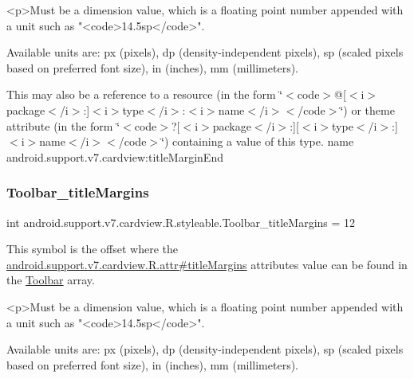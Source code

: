 \begin{DoxyVerb}      <p>Must be a dimension value, which is a floating point number appended with a unit such as "<code>14.5sp</code>".
\end{DoxyVerb}
 Available units are\+: px (pixels), dp (density-\/independent pixels), sp (scaled pixels based on preferred font size), in (inches), mm (millimeters). 

This may also be a reference to a resource (in the form \char`\"{}$<$code$>$@\mbox{[}$<$i$>$package$<$/i$>$\+:\mbox{]}$<$i$>$type$<$/i$>$\+:$<$i$>$name$<$/i$>$$<$/code$>$\char`\"{}) or theme attribute (in the form \char`\"{}$<$code$>$?\mbox{[}$<$i$>$package$<$/i$>$\+:\mbox{]}\mbox{[}$<$i$>$type$<$/i$>$\+:\mbox{]}$<$i$>$name$<$/i$>$$<$/code$>$\char`\"{}) containing a value of this type.  name android.\+support.\+v7.\+cardview\+:title\+Margin\+End \mbox{\label{classandroid_1_1support_1_1v7_1_1cardview_1_1R_1_1styleable_ae38a718516abd89948a47ede4fa58b9f}} 
\subsubsection{\texorpdfstring{Toolbar\+\_\+title\+Margins}{Toolbar\_titleMargins}}
{\footnotesize\ttfamily int android.\+support.\+v7.\+cardview.\+R.\+styleable.\+Toolbar\+\_\+title\+Margins = 12\hspace{0.3cm}{\ttfamily [static]}}

This symbol is the offset where the \hyperlink{classandroid_1_1support_1_1v7_1_1cardview_1_1R_1_1attr_a56eb14b3fe1237fddcc2b1837677a229}{android.\+support.\+v7.\+cardview.\+R.\+attr\#title\+Margins} attribute\textquotesingle{}s value can be found in the \hyperlink{classandroid_1_1support_1_1v7_1_1cardview_1_1R_1_1styleable_a26149aeb8fd339abe09ecc9d92b9304f}{Toolbar} array.

\begin{DoxyVerb}      <p>Must be a dimension value, which is a floating point number appended with a unit such as "<code>14.5sp</code>".
\end{DoxyVerb}
 Available units are\+: px (pixels), dp (density-\/independent pixels), sp (scaled pixels based on preferred font size), in (inches), mm (millimeters). 

